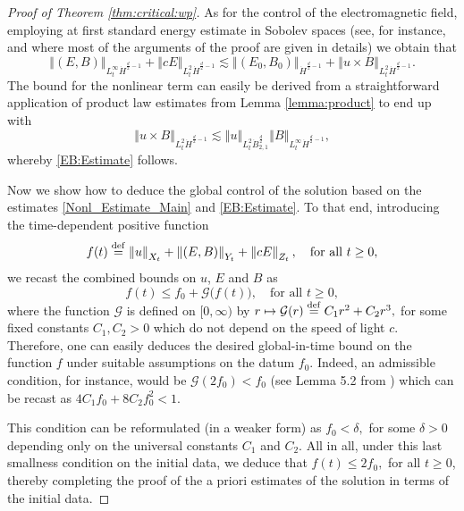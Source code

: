 \documentclass[11pt, leqno, a4paper,]{amsart}
\theoremstyle{remark}
\numberwithin{equation}{section}
\newcommand*{\bydef}{\overset{\rm def}{=}}
\newcommand*{\norm}[1]{\left\Vert #1\right\Vert}
\begin{document}
\begin{proof}[Proof of Theorem \ref{thm:critical:wp}]
 As for the control of the electromagnetic field, employing at first standard energy estimate in Sobolev spaces (see, for instance, \cite[Proposition 2.1]{ag20} and \cite[Lemma 2.5]{HH25}
where most of the arguments of the proof are given in details) we obtain that 
 \begin{equation*}
 	\norm { (E,B)}_{L^\infty _t \dot H^{\frac{d}{2}-1}} + \norm {cE}_{L^2_t \dot H^{\frac{d}{2}-1}} \lesssim \norm { (E_0,B_0)}_{ \dot H^{\frac{d}{2}-1}} + \norm {u\times B}_{L^2_t \dot H^{\frac{d}{2}-1}}.
 \end{equation*}  
The bound for the nonlinear term can easily be derived from a straightforward application of product law estimates  from Lemma \ref{lemma:product} to end up with 
\begin{equation*}
	\norm {u\times B}_{L^2_t\dot H^{\frac{d}{2}-1}}\lesssim \norm u_{L^2_t\dot B_{2,1}^{\frac{d}{2}}}\norm { B}_{L^\infty _t \dot H^{\frac{d}{2}-1}},
\end{equation*}
whereby \eqref{EB:Estimate} follows.

Now we show how to deduce the global control of the solution based on the estimates  \eqref{Nonl_Estimate_Main} and \eqref{EB:Estimate}. To that end,  introducing the time-dependent positive function 
\begin{equation*}
	f(t) \bydef \norm {u}_{X_t} + \norm {(E,B)}_{Y_t} + 
	\norm {cE}_{Z_t}, \quad \text{for all } t\geq 0,
\end{equation*}
we recast the combined bounds on $u$, $E$ and $B$ as 
\begin{equation*} 
	f(t) \leq f_0 + \mathcal G \big (f(t)\big ), \quad \text{for all } t\geq 0,
\end{equation*}
where the function $\mathcal G$ is defined on $[0,\infty)$ by  $r\mapsto \mathcal G(r) \bydef C_1 r^2 + C_2 r^3,$
for some fixed constants $C_1,C_2>0$ which do not depend on the speed of light $c$. Therefore, one can easily deduces the desired global-in-time bound on the function $f$ under suitable assumptions on the datum $f_0$. Indeed, an admissible condition, for instance, would be $\mathcal {G}(2f_0) < f_0$ (see Lemma 5.2 from \cite{ahh24}) 
which can be recast as  $4 C_1 f_0 + 8 C_2 f_0^2 <1.$


This condition can be reformulated (in a weaker form) as $f_0 < \delta,$
for some $\delta>0$ depending only on the universal constants $C_1$ and $C_2$. All in all, under this last smallness condition on the initial data, we deduce that  $f(t)\leq 2 f_0,$
for all $t\geq 0$, thereby completing the proof of the a priori estimates of the solution in terms of the initial data.


\end{proof}
\end{document}
